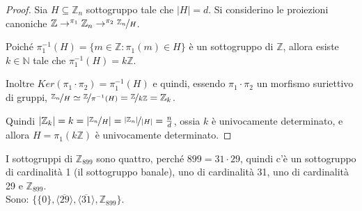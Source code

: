 \documentclass[../main.tex]{subfiles}
\begin{document}
\begin{proof}
    Sia $H \subseteq \mathbb{Z}_n$ sottogruppo tale che $|H| = d$. Si considerino le proiezioni canoniche $\mathbb{Z} \rightarrow^{\pi_1} \mathbb{Z}_n \rightarrow^{\pi_2} \nicefrac{\mathbb{Z}_n }{H}$.

    Poiché $\pi^{-1}_1 (H) = \{m \in \mathbb{Z} : \pi_1 (m) \in H\}$ è un sottogruppo di $\mathbb{Z} $, allora esiste $k \in \mathbb{N} $ tale che $\pi^{-1}_1(H) = k \mathbb{Z}$.

    Inoltre $Ker(\pi_1 \cdot \pi_2) = \pi^{-1}_1 (H)$ e quindi, essendo $\pi_1 \cdot \pi_2$ un morfismo suriettivo di gruppi, $\nicefrac{\mathbb{Z}_n }{H} \simeq \nicefrac{\mathbb{Z} }{\pi^{-1}(H)} = \nicefrac{\mathbb{Z} }{k \mathbb{Z} }= \mathbb{Z}_k$.

    Quindi $|\mathbb{Z}_k | = k =|\nicefrac{\mathbb{Z}_n }{H}| = \nicefrac{|\mathbb{Z}_n |}{|H|} = \frac{n}{d}$, ossia $k$ è univocamente determinato, e allora $H = \pi_1 (k \mathbb{Z} )$ è univocamente determinato.
\end{proof}

\begin{example}
    I sottogruppi di $\mathbb{Z}_{899}$ sono quattro, perché $899 = 31 \cdot 29$, quindi c'è un sottogruppo di
    cardinalità 1 (il sottogruppo banale), uno di cardinalità 31, uno di cardinalità 29 e $\mathbb{Z}_{899}$.\\
    Sono: $\{\{0\} , \langle \overline{29} \rangle , \langle \overline{31} \rangle , \mathbb{Z}_{899}\}$.
\end{example}
\end{document}
